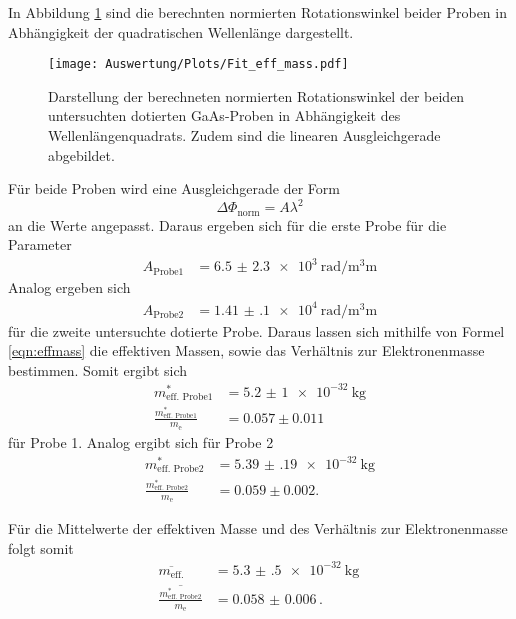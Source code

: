    In Abbildung \ref{fig:beideProben} sind die berechnten normierten Rotationswinkel beider Proben in
   Abhängigkeit der quadratischen Wellenlänge dargestellt.
   \begin{figure}[H]
       \centering
       \texttt{[image: Auswertung/Plots/Fit\_eff\_mass.pdf]}
       \caption{Darstellung der berechneten normierten Rotationswinkel der beiden untersuchten
       dotierten GaAs-Proben in Abhängigkeit des Wellenlängenquadrats. Zudem sind die linearen
       Ausgleichgerade abgebildet.}
       \label{fig:beideProben}
   \end{figure} \noindent
   Für beide Proben wird eine Ausgleichgerade der
   Form
   \begin{equation*}
       \Delta \Phi_\text{norm} = A \lambda^2
   \end{equation*} \noindent
   an die Werte angepasst. Daraus ergeben sich für die erste Probe für die Parameter
   \begin{align}
       A_\text{Probe1} &= \SI{6.5(23)e3}{\radian\per\cubic\milli\meter}
   \end{align} \noindent
   Analog ergeben sich
   \begin{align}
    A_\text{Probe2} &= \SI{1.41(10)e4}{\radian\per\cubic\milli\meter}
   \end{align} \noindent
    für die zweite untersuchte dotierte Probe. Daraus lassen sich mithilfe von Formel \ref{eqn:effmass}
    die effektiven Massen, sowie das Verhältnis zur Elektronenmasse bestimmen. Somit ergibt sich
    \begin{align}
        m_\text{eff. Probe1}^* &= \SI{5.2(10)e-32}{\kilo\gram} \\
        \frac{m_\text{eff. Probe1}^*}{m_\text{e}} &= 0.057 \pm 0.011
    \end{align}
    für Probe 1. Analog ergibt sich für Probe 2
    \begin{align}
        m_\text{eff. Probe2}^* &= \SI{5.39(19)e-32}{\kilo\gram} \\
        \frac{m_\text{eff. Probe2}^*}{m_\text{e}} &= 0.059 \pm 0.002.
    \end{align} \noindent

    Für die Mittelwerte der effektiven Masse und des Verhältnis zur Elektronenmasse folgt somit
    \begin{align}
      \overline{m_\text{eff.}} &= \SI{5.3(5)e-32}{\kilo\gram} \, \\
      \overline{\frac{m_\text{eff. Probe2}^*}{m_\text{e}}} &= \num{0.058(6)} \, .
    \end{align}
